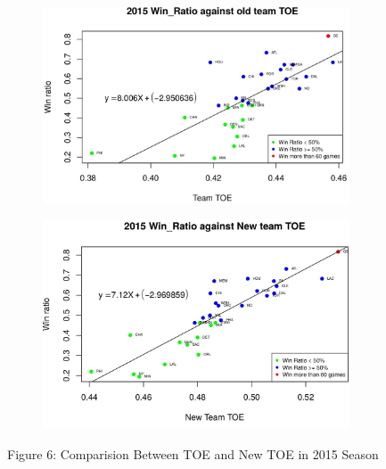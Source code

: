 \documentclass[11pt]{article}
\begin{document}
\begin{figure}[h!]
  \centering
  \begin{subfigure}[b]{0.45\linewidth}
    \includegraphics[width=\linewidth]{15old.jpg}
  \end{subfigure}
  \begin{subfigure}[b]{0.43\linewidth}
    \includegraphics[width=\linewidth]{15new.jpg}
  \end{subfigure}
\bigskip

Figure 6: Comparision Between TOE and New TOE in 2015 Season
\end{figure}
\newpage	
\end{document}
